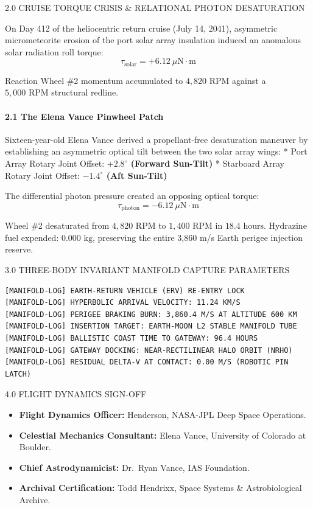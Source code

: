 \documentclass[12pt,twoside,openright]{book}
\newcommand{\sceneheader}[1]{%
  \par\vspace{1.8em}%
  {\noindent\centering\scshape\large #1\par}%
  \vspace{1.0em}%
  \noindent%
}
\newcommand{\dinkus}{%
  \par\vspace{1.2em}%
  {\noindent\centering{\large $\ast\quad\ast\quad\ast$}\par}%
  \vspace{1.2em}%
  \noindent%
}
\providecommand{\tightlist}{\setlength{\itemsep}{0pt}\setlength{\parskip}{0pt}
\setlength{\tabcolsep}{2pt}}
\begin{document}
\dinkus

\sceneheader{2.0 CRUISE TORQUE CRISIS \& RELATIONAL PHOTON
DESATURATION}

On Day 412 of the heliocentric return cruise (July 14, 2041), asymmetric
micrometeorite erosion of the port solar array insulation induced an
anomalous solar radiation roll torque:
\[\tau_{\text{solar}} = +6.12\ \mu\text{N}\cdot\text{m}\]

Reaction Wheel \#2 momentum accumulated to \(4,820\text{ RPM}\) against
a \(5,000\text{ RPM}\) structural redline.

\paragraph{2.1 The Elena Vance Pinwheel
Patch}\label{the-elena-vance-pinwheel-patch}

Sixteen-year-old Elena Vance derived a propellant-free desaturation
maneuver by establishing an asymmetric optical tilt between the two
solar array wings: * Port Array Rotary Joint Offset:
\textbf{\(+2.8^\circ\) (Forward Sun-Tilt)} * Starboard Array Rotary
Joint Offset: \textbf{\(-1.4^\circ\) (Aft Sun-Tilt)}

The differential photon pressure created an opposing optical torque:
\[\tau_{\text{photon}} = -6.12\ \mu\text{N}\cdot\text{m}\]

Wheel \#2 desaturated from \(4,820\text{ RPM}\) to \(1,400\text{ RPM}\)
in \(18.4\text{ hours}\). Hydrazine fuel expended:
\textbf{\(0.000 \text{ kg}\)}, preserving the entire 3,860 m/s Earth
perigee injection reserve.

\dinkus

\sceneheader{3.0 THREE-BODY INVARIANT MANIFOLD CAPTURE
PARAMETERS}

\begin{lstlisting}
[MANIFOLD-LOG] EARTH-RETURN VEHICLE (ERV) RE-ENTRY LOCK
[MANIFOLD-LOG] HYPERBOLIC ARRIVAL VELOCITY: 11.24 KM/S
[MANIFOLD-LOG] PERIGEE BRAKING BURN: 3,860.4 M/S AT ALTITUDE 600 KM
[MANIFOLD-LOG] INSERTION TARGET: EARTH-MOON L2 STABLE MANIFOLD TUBE
[MANIFOLD-LOG] BALLISTIC COAST TIME TO GATEWAY: 96.4 HOURS
[MANIFOLD-LOG] GATEWAY DOCKING: NEAR-RECTILINEAR HALO ORBIT (NRHO)
[MANIFOLD-LOG] RESIDUAL DELTA-V AT CONTACT: 0.00 M/S (ROBOTIC PIN LATCH)
\end{lstlisting}

\dinkus

\sceneheader{4.0 FLIGHT DYNAMICS
SIGN-OFF}

\begin{itemize}
\tightlist
\item
  \textbf{Flight Dynamics Officer:} Henderson, NASA-JPL Deep Space
  Operations.
\item
  \textbf{Celestial Mechanics Consultant:} Elena Vance, University of
  Colorado at Boulder.
\item
  \textbf{Chief Astrodynamicist:} Dr.~Ryan Vance, IAS Foundation.
\item
  \textbf{Archival Certification:} Todd Hendrixx, Space Systems \&
  Astrobiological Archive.
\end{itemize}
\end{document}
